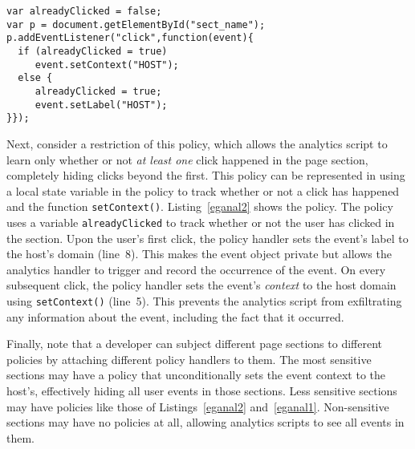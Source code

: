 

\begin{lstlisting}[float,caption=Policy that only tracks whether a click
  happened or not,label=eganal2]
var alreadyClicked = false;
var p = document.getElementById("sect_name");
p.addEventListener("click",function(event){
  if (alreadyClicked = true) 
     event.setContext("HOST");
  else {
     alreadyClicked = true; 
     event.setLabel("HOST");
}});
\end{lstlisting}

Next, consider a restriction of this policy, which allows the
analytics script to learn only whether or not \emph{at least one}
click happened in the page section, completely hiding clicks beyond
the first. This policy can be represented in {\sys} using a local
state variable in the policy to track whether or not a click has
happened and the function \texttt{setContext()}. Listing~\ref{eganal2}
shows the policy. The policy uses a variable \texttt{alreadyClicked}
to track whether or not the user has clicked in the section. Upon the
user's first click, the policy handler sets the event's label to the
host's domain (line~8). This makes the event object private but allows
the analytics handler to trigger and record the occurrence of the
event. On every subsequent click, the policy handler sets the event's
\emph{context} to the host domain using \texttt{setContext()}
(line~5). This prevents the analytics script from exfiltrating any
information about the event, including the fact that it occurred.

Finally, note that a developer can subject different page sections to
different policies by attaching different policy handlers to them. The
most sensitive sections may have a policy that unconditionally sets
the event context to the host's, effectively hiding all user events in
those sections. Less sensitive sections may have policies like those
of Listings~\ref{eganal2} and~\ref{eganal1}. Non-sensitive sections
may have no policies at all, allowing analytics scripts to see all
events in them.

